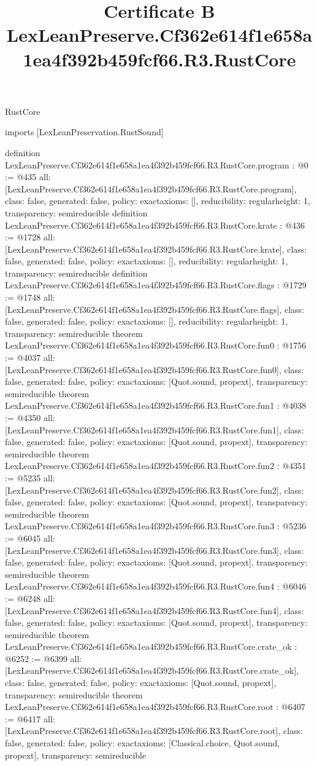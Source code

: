 \begin{lexlean}{RustCore}
\title{Certificate B LexLeanPreserve.Cf362e614f1e658a1ea4f392b459fcf66.R3.RustCore}
\begin{coremodule}
imports [LexLeanPreservation.RustSound]

definition LexLeanPreserve.Cf362e614f1e658a1ea4f392b459fcf66.R3.RustCore.program : @0 := @435 {
  all: [LexLeanPreserve.Cf362e614f1e658a1ea4f392b459fcf66.R3.RustCore.program],
  class: false,
  generated: false,
  policy: exact{axioms: []},
  reducibility: regular{height: 1},
  transparency: semireducible
}
definition LexLeanPreserve.Cf362e614f1e658a1ea4f392b459fcf66.R3.RustCore.krate : @436 := @1728 {
  all: [LexLeanPreserve.Cf362e614f1e658a1ea4f392b459fcf66.R3.RustCore.krate],
  class: false,
  generated: false,
  policy: exact{axioms: []},
  reducibility: regular{height: 1},
  transparency: semireducible
}
definition LexLeanPreserve.Cf362e614f1e658a1ea4f392b459fcf66.R3.RustCore.flags : @1729 := @1748 {
  all: [LexLeanPreserve.Cf362e614f1e658a1ea4f392b459fcf66.R3.RustCore.flags],
  class: false,
  generated: false,
  policy: exact{axioms: []},
  reducibility: regular{height: 1},
  transparency: semireducible
}
theorem LexLeanPreserve.Cf362e614f1e658a1ea4f392b459fcf66.R3.RustCore.fun0 : @1756 := @4037 {
  all: [LexLeanPreserve.Cf362e614f1e658a1ea4f392b459fcf66.R3.RustCore.fun0],
  class: false,
  generated: false,
  policy: exact{axioms: [Quot.sound, propext]},
  transparency: semireducible
}
theorem LexLeanPreserve.Cf362e614f1e658a1ea4f392b459fcf66.R3.RustCore.fun1 : @4038 := @4350 {
  all: [LexLeanPreserve.Cf362e614f1e658a1ea4f392b459fcf66.R3.RustCore.fun1],
  class: false,
  generated: false,
  policy: exact{axioms: [Quot.sound, propext]},
  transparency: semireducible
}
theorem LexLeanPreserve.Cf362e614f1e658a1ea4f392b459fcf66.R3.RustCore.fun2 : @4351 := @5235 {
  all: [LexLeanPreserve.Cf362e614f1e658a1ea4f392b459fcf66.R3.RustCore.fun2],
  class: false,
  generated: false,
  policy: exact{axioms: [Quot.sound, propext]},
  transparency: semireducible
}
theorem LexLeanPreserve.Cf362e614f1e658a1ea4f392b459fcf66.R3.RustCore.fun3 : @5236 := @6045 {
  all: [LexLeanPreserve.Cf362e614f1e658a1ea4f392b459fcf66.R3.RustCore.fun3],
  class: false,
  generated: false,
  policy: exact{axioms: [Quot.sound, propext]},
  transparency: semireducible
}
theorem LexLeanPreserve.Cf362e614f1e658a1ea4f392b459fcf66.R3.RustCore.fun4 : @6046 := @6248 {
  all: [LexLeanPreserve.Cf362e614f1e658a1ea4f392b459fcf66.R3.RustCore.fun4],
  class: false,
  generated: false,
  policy: exact{axioms: [Quot.sound, propext]},
  transparency: semireducible
}
theorem LexLeanPreserve.Cf362e614f1e658a1ea4f392b459fcf66.R3.RustCore.crate_ok : @6252 := @6399 {
  all: [LexLeanPreserve.Cf362e614f1e658a1ea4f392b459fcf66.R3.RustCore.crate_ok],
  class: false,
  generated: false,
  policy: exact{axioms: [Quot.sound, propext]},
  transparency: semireducible
}
theorem LexLeanPreserve.Cf362e614f1e658a1ea4f392b459fcf66.R3.RustCore.root : @6407 := @6417 {
  all: [LexLeanPreserve.Cf362e614f1e658a1ea4f392b459fcf66.R3.RustCore.root],
  class: false,
  generated: false,
  policy: exact{axioms: [Classical.choice, Quot.sound, propext]},
  transparency: semireducible
}


\end{coremodule}
\end{lexlean}
